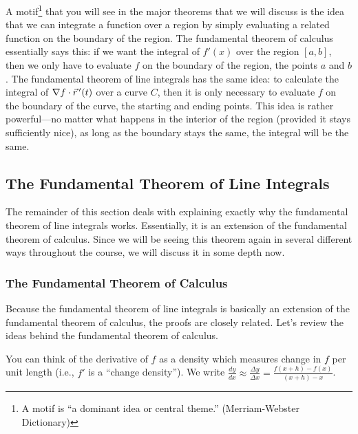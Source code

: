 A motif\footnote{A motif is ``a dominant idea or central theme.''
  (Merriam-Webster Dictionary)} that
you will see in the major theorems that we will discuss is the idea
that we can integrate a function over a region by simply evaluating
a related function on the boundary of the region.  The fundamental
theorem of calculus essentially says this: if we want the integral of
$f'(x)$ over the region $[a,b]$, then we only have to evaluate $f$ on
the boundary of the region, the points $a$ and $b$.  The fundamental
theorem of line integrals has the same idea: to calculate the integral
of $\nabla f\cdot \vec r^{\,\prime}(t)$ over a curve $C$, then it is only necessary to
evaluate $f$ on the boundary of the curve, the starting and ending
points.  This idea is rather powerful---no matter what happens in the
interior of the region (provided it stays sufficiently
nice), as long as the boundary stays the same, the integral will be
the same.

\subsection{The Fundamental Theorem of Line Integrals}

The remainder of this section deals with explaining exactly why the
fundamental theorem of line integrals works. Essentially, it is an
extension of the fundamental theorem of calculus. Since we will be
seeing this theorem again in several different ways throughout the
course, we will discuss it in some depth now.

\subsubsection{The Fundamental Theorem of Calculus}

Because the fundamental theorem of line integrals is basically an
extension of the fundamental theorem of calculus, the proofs are
closely related.  Let's review the ideas behind the fundamental
theorem of calculus.

You can think of the derivative of $f$ as a density which measures
change in $f$ per unit length (i.e., $f'$ is a ``change density''). We
write $\frac{dy}{dx}\approx \frac{\Delta y}{\Delta x} = \frac{f(x+h)-f(x)}{(x+h)-x}$.

